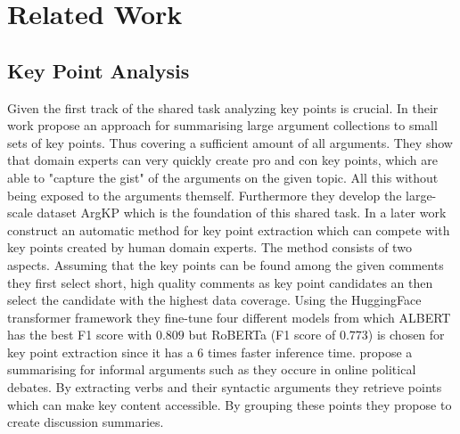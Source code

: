 \section{Related Work}\label{related-work}


\subsection{Key Point Analysis}
Given the first track of the shared task analyzing key points is crucial. In their work \cite{Bar-HaimEFKLS2020} 
\citeauthor{Bar-HaimEFKLS2020} propose an approach for summarising large argument collections to small sets of key points. Thus
covering a sufficient amount of all arguments. They show that domain experts can very quickly
create pro and con key points, which are able to "capture the gist" of the arguments on the given topic. All this
without being exposed to the arguments themself. Furthermore they develop the large-scale dataset ArgKP
which is the foundation of this shared task. 
In a later work \citet{Bar-HaimKEFLS2020} construct an automatic method for key point 
extraction which can compete with key points created by human domain experts. The method consists of two aspects. 
Assuming that the key points can be found among the given comments 
they first select short, high quality comments as key point candidates an then select the candidate with the highest
data coverage. Using the HuggingFace transformer framework they fine-tune four different models from which 
ALBERT \cite{lan2019albert} has the best F1 score with $0.809$ but RoBERTa \cite{LiuOGDJCLLZS2019} (F1 score of 
$0.773$) is chosen for key point extraction since it has a 6 times faster inference time. 
\citet{egan2016summarising} propose a summarising for informal arguments such as they
occure in online political debates. By extracting verbs and their syntactic arguments they retrieve points which
can make key content accessible. By grouping these points they propose to create discussion summaries.

